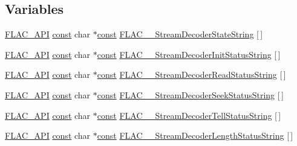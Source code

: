 \subsection*{Variables}
\begin{DoxyCompactItemize}
\item 
\hyperlink{group__flac__export_ga56ca07df8a23310707732b1c0007d6f5}{F\+L\+A\+C\+\_\+\+A\+PI} \hyperlink{getopt1_8c_a2c212835823e3c54a8ab6d95c652660e}{const} char $\ast$\hyperlink{getopt1_8c_a2c212835823e3c54a8ab6d95c652660e}{const} \hyperlink{group__flac__stream__decoder_gae1c6a6fb59fce39e251233fa221fe61d}{F\+L\+A\+C\+\_\+\+\_\+\+Stream\+Decoder\+State\+String} \mbox{[}$\,$\mbox{]}
\item 
\hyperlink{group__flac__export_ga56ca07df8a23310707732b1c0007d6f5}{F\+L\+A\+C\+\_\+\+A\+PI} \hyperlink{getopt1_8c_a2c212835823e3c54a8ab6d95c652660e}{const} char $\ast$\hyperlink{getopt1_8c_a2c212835823e3c54a8ab6d95c652660e}{const} \hyperlink{group__flac__stream__decoder_ga34953a802ba44d861dcc8e9f2bb9d659}{F\+L\+A\+C\+\_\+\+\_\+\+Stream\+Decoder\+Init\+Status\+String} \mbox{[}$\,$\mbox{]}
\item 
\hyperlink{group__flac__export_ga56ca07df8a23310707732b1c0007d6f5}{F\+L\+A\+C\+\_\+\+A\+PI} \hyperlink{getopt1_8c_a2c212835823e3c54a8ab6d95c652660e}{const} char $\ast$\hyperlink{getopt1_8c_a2c212835823e3c54a8ab6d95c652660e}{const} \hyperlink{group__flac__stream__decoder_gadad9526cb960d7d0ac0ca19124d40b2a}{F\+L\+A\+C\+\_\+\+\_\+\+Stream\+Decoder\+Read\+Status\+String} \mbox{[}$\,$\mbox{]}
\item 
\hyperlink{group__flac__export_ga56ca07df8a23310707732b1c0007d6f5}{F\+L\+A\+C\+\_\+\+A\+PI} \hyperlink{getopt1_8c_a2c212835823e3c54a8ab6d95c652660e}{const} char $\ast$\hyperlink{getopt1_8c_a2c212835823e3c54a8ab6d95c652660e}{const} \hyperlink{group__flac__stream__decoder_gac793d777a3d5a63e735415b9bea5b20a}{F\+L\+A\+C\+\_\+\+\_\+\+Stream\+Decoder\+Seek\+Status\+String} \mbox{[}$\,$\mbox{]}
\item 
\hyperlink{group__flac__export_ga56ca07df8a23310707732b1c0007d6f5}{F\+L\+A\+C\+\_\+\+A\+PI} \hyperlink{getopt1_8c_a2c212835823e3c54a8ab6d95c652660e}{const} char $\ast$\hyperlink{getopt1_8c_a2c212835823e3c54a8ab6d95c652660e}{const} \hyperlink{group__flac__stream__decoder_ga907456321fb657036c7d5a48ef2adfa6}{F\+L\+A\+C\+\_\+\+\_\+\+Stream\+Decoder\+Tell\+Status\+String} \mbox{[}$\,$\mbox{]}
\item 
\hyperlink{group__flac__export_ga56ca07df8a23310707732b1c0007d6f5}{F\+L\+A\+C\+\_\+\+A\+PI} \hyperlink{getopt1_8c_a2c212835823e3c54a8ab6d95c652660e}{const} char $\ast$\hyperlink{getopt1_8c_a2c212835823e3c54a8ab6d95c652660e}{const} \hyperlink{group__flac__stream__decoder_ga434d91c0bf414d7c432bc6e761bdd55e}{F\+L\+A\+C\+\_\+\+\_\+\+Stream\+Decoder\+Length\+Status\+String} \mbox{[}$\,$\mbox{]}

\end{DoxyCompactItemize}
